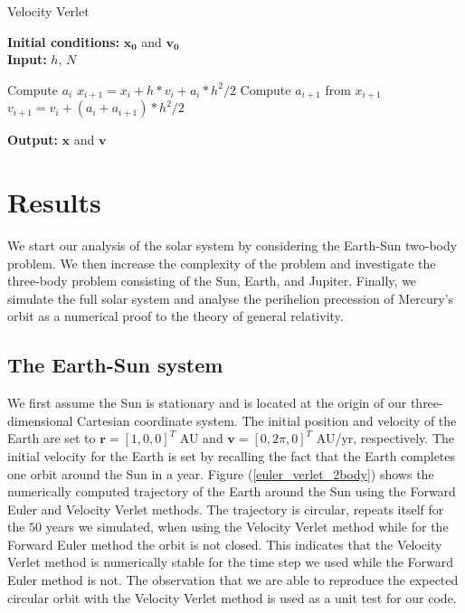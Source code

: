 \documentclass[a4paper]{article}
\begin{document}
\begin{algorithm}[H]
\caption{Velocity Verlet}\label{algo-VV}
\textbf{Initial conditions:} $\mathbf{x_0}$ and $\mathbf{v_0}$ \\
\textbf{Input:} $h$, $N$
\begin{algorithmic}[1]
\State Compute $a_{i}$
\State $x_{i+1} = x_{i} + h*v_{i} + a_{i} * h^{2}/2$ \qquad \State Compute $a_{i+1}$ from $x_{i+1}$
\State $v_{i+1} = v_{i} + (a_{i} + a_{i+1}) * h^2/2$ \qquad
\EndFor
\EndWhile
\end{algorithmic}
\textbf{Output:} $\mathbf{x}$ and $\mathbf{v}$
\label{alg-vv}
\end{algorithm}





\section{Results}
We start our analysis of the solar system by considering the Earth-Sun two-body problem. We then increase the complexity of the problem and investigate the three-body problem consisting of the Sun, Earth, and Jupiter. Finally, we simulate the full solar system and analyse the perihelion precession of Mercury's orbit as a numerical proof to the theory of general relativity.

\subsection{The Earth-Sun system}
We first assume the Sun is stationary and is located at the origin of our three-dimensional Cartesian coordinate system. The initial position and velocity of the Earth are set to $\mathbf{r} = [1, 0, 0]^T$ AU and $\mathbf{v} = [0, 2\pi, 0]^T$ AU/yr, respectively. The initial velocity for the Earth is set by recalling the fact that the Earth completes one orbit around the Sun in a year. Figure (\ref{euler_verlet_2body}) shows the numerically computed trajectory of the Earth around the Sun using the Forward Euler and Velocity Verlet methods. The trajectory is circular, repeats itself for the $50$ years we simulated, when using the Velocity Verlet method while for the Forward Euler method the orbit is not closed. This indicates that the Velocity Verlet method is numerically stable for the time step we used while the Forward Euler method is not. The observation that we are able to reproduce the expected circular orbit with the Velocity Verlet method is used as a unit test for our code. 
\end{document}
